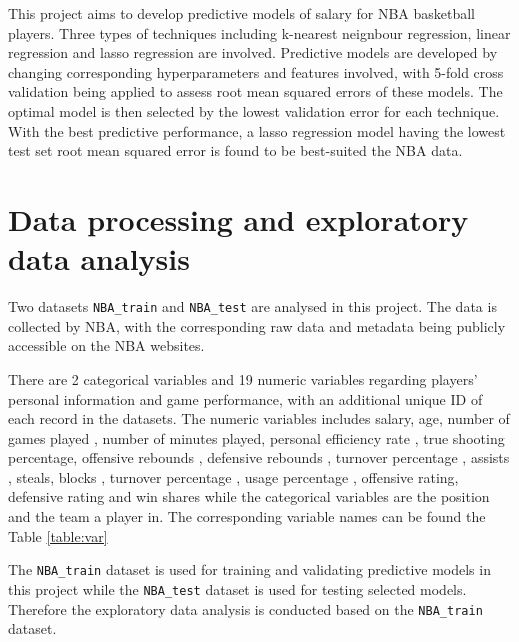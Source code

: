 \documentclass[letterpaper,12pt,twoside,]{pinp}
\begin{document}
This project aims to develop predictive models of salary for NBA
basketball players. Three types of techniques including k-nearest
neignbour regression, linear regression and lasso regression are
involved. Predictive models are developed by changing corresponding
hyperparameters and features involved, with 5-fold cross validation
being applied to assess root mean squared errors of these models. The
optimal model is then selected by the lowest validation error for each
technique. With the best predictive performance, a lasso regression
model having the lowest test set root mean squared error is found to be
best-suited the NBA data.

\hypertarget{data-processing-and-exploratory-data-analysis}{%
\section{Data processing and exploratory data
analysis}\label{data-processing-and-exploratory-data-analysis}}

Two datasets \texttt{NBA\_train} and \texttt{NBA\_test} are analysed in
this project. The data is collected by NBA, with the corresponding raw
data and metadata being publicly accessible on the NBA websites.

There are 2 categorical variables and 19 numeric variables regarding
players' personal information and game performance, with an additional
unique ID of each record in the datasets. The numeric variables includes
salary, age, number of games played , number of minutes played, personal
efficiency rate , true shooting percentage, offensive rebounds ,
defensive rebounds , turnover percentage , assists , steals, blocks ,
turnover percentage , usage percentage , offensive rating, defensive
rating and win shares while the categorical variables are the position
and the team a player in. The corresponding variable names can be found
the Table \ref{table:var}

The \texttt{NBA\_train} dataset is used for training and validating
predictive models in this project while the \texttt{NBA\_test} dataset
is used for testing selected models. Therefore the exploratory data
analysis is conducted based on the \texttt{NBA\_train} dataset.
\end{document}
